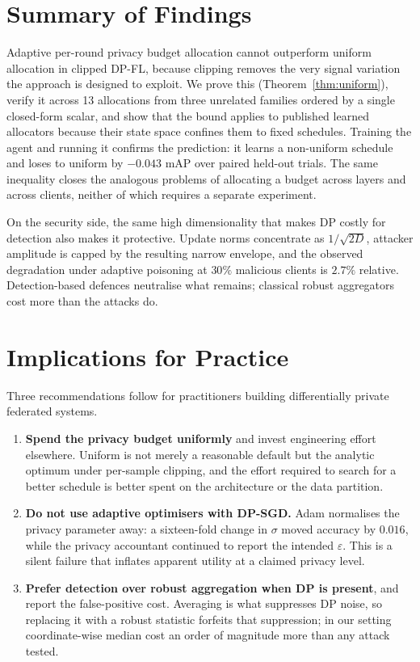 \label{sec:discussion}

\section{Summary of Findings}

Adaptive per-round privacy budget allocation cannot outperform uniform
allocation in clipped DP-FL, because clipping removes the very signal variation
the approach is designed to exploit. We prove this
(Theorem~\ref{thm:uniform}), verify it across 13 allocations from three
unrelated families ordered by a single closed-form scalar, and show that the
bound applies to published learned allocators because their state space confines
them to fixed schedules. Training the agent and running it confirms the
prediction: it learns a non-uniform schedule and loses to uniform by $-0.043$
mAP over paired held-out trials. The same inequality closes the analogous
problems of allocating a budget across layers and across clients, neither of
which requires a separate experiment.

\vspace{10pt}

On the security side, the same high dimensionality that makes DP costly for
detection also makes it protective. Update norms concentrate as $1/\sqrt{2D}$,
attacker amplitude is capped by the resulting narrow envelope, and the observed
degradation under adaptive poisoning at $30\%$ malicious clients is $2.7\%$
relative. Detection-based defences neutralise what remains; classical robust
aggregators cost more than the attacks do.

\section{Implications for Practice}

Three recommendations follow for practitioners building differentially private
federated systems.

\begin{enumerate}[label=\arabic*.]
  \item \textbf{Spend the privacy budget uniformly} and invest engineering
  effort elsewhere. Uniform is not merely a reasonable default but the analytic
  optimum under per-sample clipping, and the effort required to search for a
  better schedule is better spent on the architecture or the data partition.
  \item \textbf{Do not use adaptive optimisers with DP-SGD.} Adam normalises the
  privacy parameter away: a sixteen-fold change in $\sigma$ moved accuracy by
  $0.016$, while the privacy accountant continued to report the intended
  $\varepsilon$. This is a silent failure that inflates apparent utility at a
  claimed privacy level.
  \item \textbf{Prefer detection over robust aggregation when DP is present},
  and report the false-positive cost. Averaging is what suppresses DP noise, so
  replacing it with a robust statistic forfeits that suppression; in our setting
  coordinate-wise median cost an order of magnitude more than any attack tested.
\end{enumerate}

